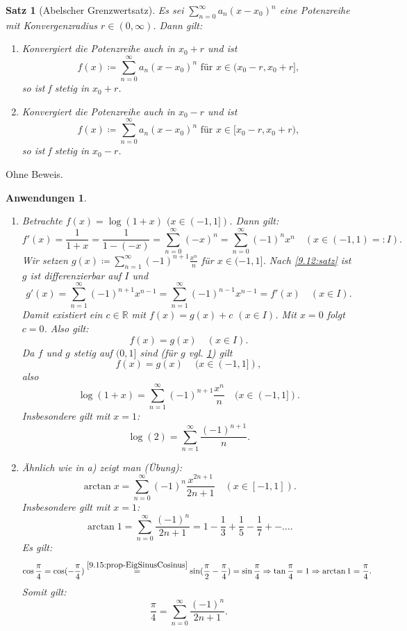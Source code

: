 \documentclass[12pt]{extreport} %
\newcommand{\R}{\mathbb{R}}
\theoremstyle{named}
\theoremstyle{itshape}
\newtheorem{satz}[unnamedtheorem]{Satz}
\theoremstyle{normal}
\newtheorem{anwendungen}[unnamedtheorem]{Anwendungen}
\begin{document}
{
\begin{satz}[Abelscher Grenzwertsatz] \label{9.16:prop-AbelscherGrenzwertsatz}
Es sei $\sum_{n=0}^{\infty} a_{n} (x - x_{0})^{n}$ eine Potenzreihe mit Konvergenzradius $r \in (0,\infty)$. Dann gilt:
	\begin{enumerate}
		\item Konvergiert die Potenzreihe auch in $x_{0} + r$ und ist
			$$ f(x) \coloneqq \sum_{n=0}^{\infty} a_{n} (x - x_{0})^{n} \text{ für } x \in (x_{0} - r, x_{0} + r], $$
			so ist f stetig in $x_{0} + r$.
		\item  Konvergiert die Potenzreihe auch in $x_{0} - r$ und ist
			$$ f(x) \coloneqq \sum_{n=0}^{\infty} a_{n} (x - x_{0})^{n} \text{ für } x \in [x_{0} - r, x_{0} + r), $$
			so ist f stetig in $x_{0} - r$.
	\end{enumerate}
\end{satz}

Ohne Beweis.

\begin{anwendungen} ~\ \label{9.17:anwendungen}
	\begin{enumerate}
		\item Betrachte $f(x) = \log(1+x)$ $(x \in (-1, 1])$. Dann gilt: \label{9.17.a:anwendungen}
			$$ f'(x) = \frac{1}{1+x} = \frac{1}{1 - (-x)} = \sum_{n=0}^{\infty} (-x)^{n} = \sum_{n=0}^{\infty} (-1)^{n} x^{n} \quad (x \in (-1,1)=:I). $$
			Wir setzen $g(x) \coloneqq \sum_{n=1}^{\infty} (-1)^{n+1} \frac{x^{n}}{n}$ für $x \in (-1, 1]$. Nach \ref{9.12:satz} ist $g$ ist differenzierbar auf $I$ und 
			$$ g'(x) = \sum_{n=1}^{\infty} (-1)^{n+1} x^{n-1} = \sum_{n=1}^{\infty} (-1)^{n-1} x^{n-1} = f'(x) \quad (x \in I). $$
			Damit existiert ein $c \in \R$ mit $f(x) = g(x) + c$ $(x \in I)$. Mit $x = 0$ folgt $c = 0$. Also gilt:
			$$ f(x) = g(x) \quad (x \in I). $$
			Da $f$ und $g$ stetig auf $(0,1]$ sind (für $g$ vgl. \ref{9.16:prop-AbelscherGrenzwertsatz}) gilt
			$$f(x) = g(x) ~ \quad (x \in (-1, 1]), $$ also 
			$$ \log(1+x) = \sum_{n=1}^{\infty} (-1)^{n+1} \frac{x^{n}}{n} \quad (x \in (-1 , 1]). $$
			Insbesondere gilt mit $x = 1$: 
			$$\log(2) = \sum_{n=1}^{\infty} \frac{(-1)^{n+1}}{n}.$$ 
		\item  Ähnlich wie in a) zeigt man (\"Ubung): \label{9.17.b:anwendungen}
			$$ \arctan x = \sum_{n=0}^{\infty} (-1)^{n} \frac{x^{2n +1}}{2n + 1} \quad (x \in [-1, 1]). $$
			Insbesondere gilt mit $x = 1$: 
			$$\arctan 1 = \sum_{n=0}^{\infty} \frac{(-1)^{n}}{2n + 1} = 1 - \frac{1}{3} + \frac{1}{5} - \frac{1}{7} +- \dotsc.$$
			Es gilt:
		        $$ \cos \frac{\pi}{4} = \cos(-\frac{\pi}{4}) \overset{\ref{9.15:prop-EigSinusCosinus}}{=} \sin( \frac{\pi}{2} - \frac{\pi}{4}) 
		        = \sin \frac{\pi}{4} \Rightarrow \tan \frac{\pi}{4} = 1 \Rightarrow \arctan 1 = \frac{\pi}{4}. $$
		        Somit gilt:
		        $$\frac{\pi}{4} = \sum_{n=0}^{\infty} \frac{(-1)^{n}}{2n + 1}.$$
	\end{enumerate}
\end{anwendungen}

}
\end{document}

